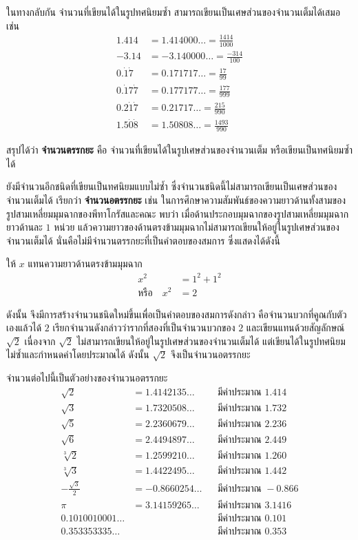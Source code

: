 ในทางกลับกัน จำนวนที่เขียนได้ในรูปทศนิยมซ้ำ สามารถเขียนเป็นเศษส่วนของจำนวนเต็มได้เสมอ เช่น
\begin{align*}
	1.414 &= 1.414000\ldots = \frac{1414}{1000} \\
	-3.14 &= -3.140000\ldots = \frac{-314}{100} \\
	0.\dot{1}\dot{7} &= 0.171717\ldots = \frac{17}{99} \\
	0.\dot{1}7\dot{7} &= 0.177177\ldots = \frac{177}{999} \\
	0.2\dot{1}\dot{7} &= 0.21717\ldots = \frac{215}{990} \\
	1.5\dot{0}\dot{8} &= 1.50808\ldots = \frac{1493}{990}
\end{align*}

สรุปได้ว่า \textbf{จำนวนตรรกยะ} คือ จำนวนที่เขียนได้ในรูปเศษส่วนของจำนวนเต็ม หรือเขียนเป็นทศนิยมซ้ำได้

ยังมีจำนวนอีกชนิดที่เขียนเป็นทศนิยมแบบไม่ซ้ำ ซึ่งจำนวนชนิดนี้ไม่สามารถเขียนเป็นเศษส่วนของจำนวนเต็มได้ เรียกว่า \textbf{จำนวนอตรรกยะ} เช่น ในการศึกษาความสัมพันธ์ของความยาวด้านทั้งสามของรูปสามเหลี่ยมมุมฉากของพีทาโกรัสและคณะ พบว่า เมื่อด้านประกอบมุมฉากของรูปสามเหลี่ยมมุมฉากยาวด้านละ $1$ หน่วย แล้วความยาวของด้านตรงข้ามมุมฉากไม่สามารถเขียนให้อยู่ในรูปเศษส่วนของจำนวนเต็มได้ นั่นคือไม่มีจำนวนตรรกยะที่เป็นคำตอบของสมการ ซึ่งแสดงได้ดังนี้

ให้ $x$ แทนความยาวด้านตรงข้ามมุมฉาก
\begin{align*}
	x^2 &= 1^2 + 1^2 \\
	\text{หรือ} \quad x^2 &= 2
\end{align*}

ดังนั้น จึงมีการสร้างจำนวนชนิดใหม่ขึ้นเพื่อเป็นคำตอบของสมการดังกล่าว คือจำนวนบวกที่คูณกับตัวเองแล้วได้ $2$ เรียกจำนวนดังกล่าวว่ารากที่สองที่เป็นจำนวนบวกของ $2$ และเขียนแทนด้วยสัญลักษณ์ $\sqrt{2}$ เนื่องจาก $\sqrt{2}$ ไม่สามารถเขียนให้อยู่ในรูปเศษส่วนของจำนวนเต็มได้ แต่เขียนได้ในรูปทศนิยมไม่ซ้ำและกำหนดค่าโดยประมาณได้ ดังนั้น $\sqrt{2}$ จึงเป็นจำนวนอตรรกยะ

จำนวนต่อไปนี้เป็นตัวอย่างของจำนวนอตรรกยะ
\begin{align*}
	\sqrt{2} &= 1.4142135\ldots && \text{มีค่าประมาณ } 1.414 \\
	\sqrt{3} &= 1.7320508\ldots && \text{มีค่าประมาณ } 1.732 \\
	\sqrt{5} &= 2.2360679\ldots && \text{มีค่าประมาณ } 2.236 \\
	\sqrt{6} &= 2.4494897\ldots && \text{มีค่าประมาณ } 2.449 \\
	\sqrt[3]{2} &= 1.2599210\ldots && \text{มีค่าประมาณ } 1.260 \\
	\sqrt[3]{3} &= 1.4422495\ldots && \text{มีค่าประมาณ } 1.442 \\
	-\frac{\sqrt{3}}{2} &= -0.8660254\ldots && \text{มีค่าประมาณ } -0.866 \\
	\pi &= 3.14159265\ldots && \text{มีค่าประมาณ } 3.1416 \\
	0.1010010001\ldots &&& \text{มีค่าประมาณ } 0.101 \\
	0.353353335\ldots &&& \text{มีค่าประมาณ } 0.353
\end{align*}

